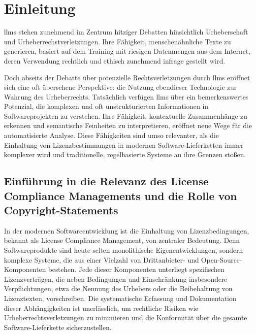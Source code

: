 \chapter{Einleitung}\label{ch:einleitung}

\glspl{llm} stehen zunehmend im Zentrum hitziger Debatten hinsichtlich Urheberschaft und Urheberrechstverletzungen.
Ihre Fähigkeit, menschenähnliche Texte zu generieren, basiert auf dem Training mit riesigen Datenmengen aus dem Internet, deren Verwendung rechtlich und ethisch zunehmend infrage gestellt wird.

Doch abseits der Debatte über potenzielle Rechtsverletzungen durch \glspl{llm} eröffnet sich eine oft übersehene Perspektive: die Nutzung ebendieser Technologie zur Wahrung des Urheberrechts.
Tatsächlich verfügen \glspl{llm} über ein bemerkenswertes Potenzial, die komplexen und oft unstrukturierten Informationen in Softwareprojekten zu verstehen.
Ihre Fähigkeit, kontextuelle Zusammenhänge zu erkennen und semantische Feinheiten zu interpretieren, eröffnet neue Wege für die automatisierte Analyse.
Diese Fähigkeiten sind umso relevanter, als die Einhaltung von Lizenzbestimmungen in modernen Software-Lieferketten immer komplexer wird und traditionelle, regelbasierte Systeme an ihre Grenzen stoßen.


\section{Einführung in die Relevanz des License Compliance Managements und die Rolle von Copyright-Statements}\label{sec:einfuhrung}

In der modernen Softwareentwicklung ist die Einhaltung von Lizenzbedingungen, bekannt als License Compliance Management, von zentraler Bedeutung.
Denn Softwareprodukte sind heute selten monolithische Eigenentwicklungen, sondern komplexe Systeme, die aus einer Vielzahl von Drittanbieter- und Open-Source-Komponenten bestehen.
Jede dieser Komponenten unterliegt spezifischen Lizenzverträgen, die neben Bedingungen und Einschränkung insbesondere Verpflichtungen, etwa die Nennung des Urhebers oder die Beibehaltung von Lizenztexten, vorschreiben.
Die systematische Erfassung und Dokumentation dieser Abhängigkeiten ist unerlässlich, um rechtliche Risiken wie Urheberrechtsverletzungen zu minimieren und die Konformität über die gesamte Software-Lieferkette sicherzustellen.

